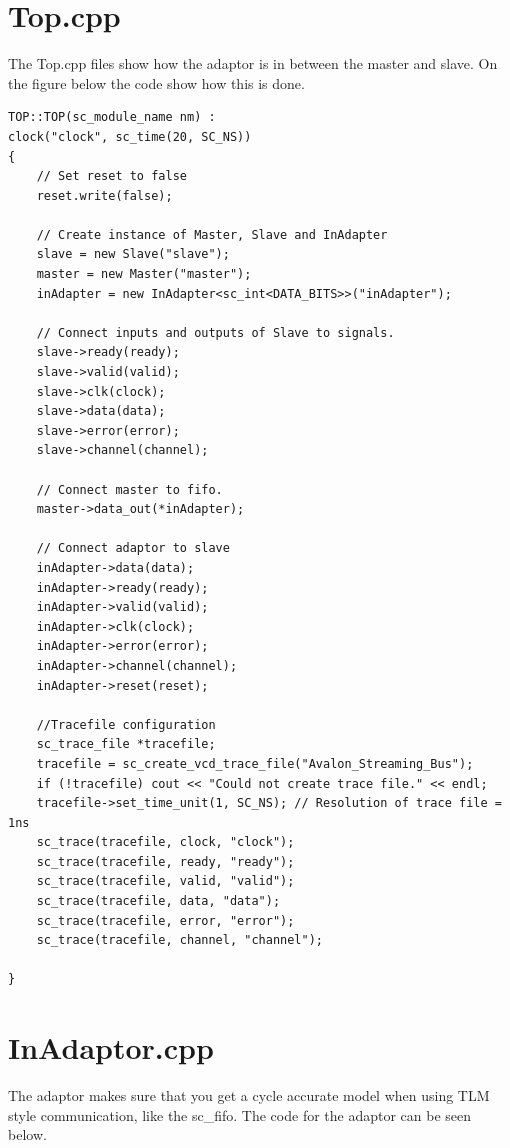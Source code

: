 \section{Top.cpp}
The Top.cpp files show how the adaptor is in between the master and slave. On the figure below the code show how this is done.


\begin{lstlisting}
TOP::TOP(sc_module_name nm) :
clock("clock", sc_time(20, SC_NS))
{
	// Set reset to false
	reset.write(false);
	
	// Create instance of Master, Slave and InAdapter
	slave = new Slave("slave");
	master = new Master("master");
	inAdapter = new InAdapter<sc_int<DATA_BITS>>("inAdapter");
	
	// Connect inputs and outputs of Slave to signals.
	slave->ready(ready);
	slave->valid(valid);
	slave->clk(clock);
	slave->data(data);
	slave->error(error);
	slave->channel(channel);
	
	// Connect master to fifo.
	master->data_out(*inAdapter);
	
	// Connect adaptor to slave
	inAdapter->data(data);
	inAdapter->ready(ready);
	inAdapter->valid(valid);
	inAdapter->clk(clock);
	inAdapter->error(error);
	inAdapter->channel(channel);
	inAdapter->reset(reset);
	
	//Tracefile configuration
	sc_trace_file *tracefile;
	tracefile = sc_create_vcd_trace_file("Avalon_Streaming_Bus");
	if (!tracefile) cout << "Could not create trace file." << endl;
	tracefile->set_time_unit(1, SC_NS); // Resolution of trace file = 1ns
	sc_trace(tracefile, clock, "clock");
	sc_trace(tracefile, ready, "ready");
	sc_trace(tracefile, valid, "valid");
	sc_trace(tracefile, data, "data");
	sc_trace(tracefile, error, "error");
	sc_trace(tracefile, channel, "channel");

}
\end{lstlisting}

\section{InAdaptor.cpp}
The adaptor makes sure that you get a cycle accurate model when using TLM style communication, like the sc\_fifo. The code for the adaptor can be seen below.


